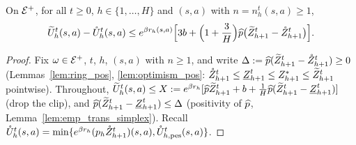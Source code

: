 \begin{lemma}\label{lem:certificate_pos}
\leanok
{}
On $\mathcal{E}^+$, for all $t \ge 0$, $h \in \{1, \dots, H\}$ and $(s,a)$ with $n = n_h^t(s,a) \ge 1$,
\[
  \widetilde{U}_h^t(s,a) - \mathring{U}_h^t(s,a)
  \le e^{\beta r_h(s,a)}\Big[3 b + \Big(1 + \frac3H\Big)\widehat{p}\big(\widetilde{Z}^t_{h+1} - \mathring{Z}^t_{h+1}\big)\Big] .
\]
\end{lemma}

\begin{proof}
\leanok
Fix $\omega \in \mathcal{E}^+$, $t$, $h$, $(s,a)$ with $n \ge 1$, and write $\Delta := \widehat{p}(\widetilde{Z}^t_{h+1} - \mathring{Z}^t_{h+1}) \ge 0$
(Lemmas~\ref{lem:ring_pos}, \ref{lem:optimism_pos}: $\mathring{Z}^t_{h+1} \le \underline{Z}^t_{h+1} \le Z^*_{h+1} \le \widetilde{Z}^t_{h+1}$
pointwise). Throughout, $\widetilde{U}_h^t(s,a) \le X := e^{\beta r_h}[\widehat{p}\widetilde{Z}^t_{h+1} + b + \frac1H\widehat{p}(\widetilde{Z}^t_{h+1} - \underline{Z}^t_{h+1})]$
(drop the clip), and $\widehat{p}(\widetilde{Z}^t_{h+1} - \underline{Z}^t_{h+1}) \le \Delta$ (positivity of $\widehat{p}$,
Lemma~\ref{lem:emp_trans_simplex}). Recall $\mathring{U}_h^t(s,a) = \min\{e^{\beta r_h}(p_h\mathring{Z}^t_{h+1})(s,a), \mathring{U}^t_{h,\mathrm{pes}}(s,a)\}$.


\end{proof}
